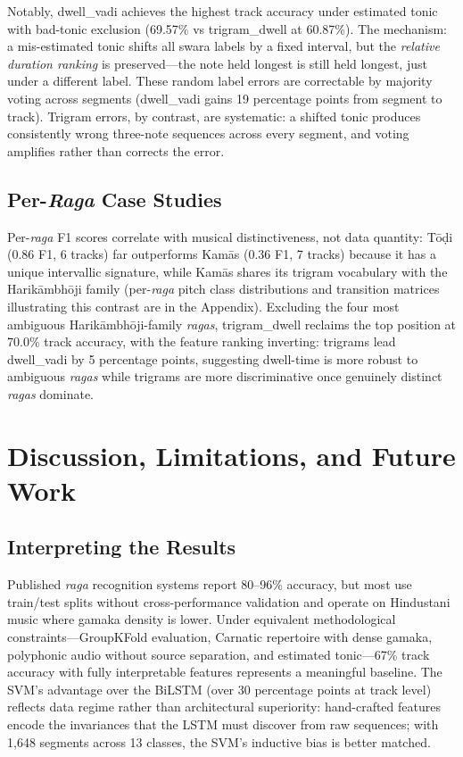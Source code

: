 \documentclass[11pt,a4paper]{article}
\begin{document}
{Notably, dwell\_vadi achieves the highest track accuracy under estimated tonic with bad-tonic exclusion (69.57\% vs trigram\_dwell at 60.87\%). The mechanism: a mis-estimated tonic shifts all swara labels by a fixed interval, but the \emph{relative duration ranking} is preserved---the note held longest is still held longest, just under a different label. These random label errors are correctable by majority voting across segments (dwell\_vadi gains 19 percentage points from segment to track). Trigram errors, by contrast, are systematic: a shifted tonic produces consistently wrong three-note sequences across every segment, and voting amplifies rather than corrects the error.

\subsection{Per-\textit{Raga} Case Studies}
\label{sec:perraga}

Per-\textit{raga} F1 scores correlate with musical distinctiveness, not data quantity: T\=o\d{d}i (0.86 F1, 6 tracks) far outperforms Kam\=as (0.36 F1, 7 tracks) because it has a unique intervallic signature, while Kam\=as shares its trigram vocabulary with the Harik\=ambh\=oji family (per-\textit{raga} pitch class distributions and transition matrices illustrating this contrast are in the Appendix). Excluding the four most ambiguous Harik\=ambh\=oji-family \textit{ragas}, trigram\_dwell reclaims the top position at 70.0\% track accuracy, with the feature ranking inverting: trigrams lead dwell\_vadi by 5 percentage points, suggesting dwell-time is more robust to ambiguous \textit{ragas} while trigrams are more discriminative once genuinely distinct \textit{ragas} dominate.

\section{Discussion, Limitations, and Future Work}

\subsection{Interpreting the Results}

Published \textit{raga} recognition systems report 80--96\% accuracy, but most use train/test splits without cross-performance validation and operate on Hindustani music where gamaka density is lower. Under equivalent methodological constraints---GroupKFold evaluation, Carnatic repertoire with dense gamaka, polyphonic audio without source separation, and estimated tonic---67\% track accuracy with fully interpretable features represents a meaningful baseline. The SVM's advantage over the BiLSTM (over 30 percentage points at track level) reflects data regime rather than architectural superiority: hand-crafted features encode the invariances that the LSTM must discover from raw sequences; with 1,648 segments across 13 classes, the SVM's inductive bias is better matched.

}
\end{document}
